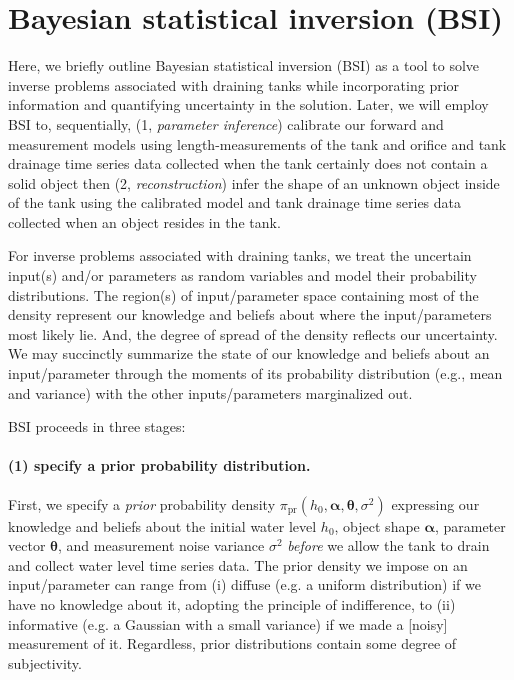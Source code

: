 \documentclass[openacc]{rsproca_new}%
\begin{document}
\section{Bayesian statistical inversion (BSI)} \label{sec:bsi}
Here, we briefly outline Bayesian statistical inversion (BSI)  \cite{calvetti2018inverse,waqar2023tutorial,kaipio2006statistical,dashti2013bayesian} as a tool to solve inverse problems associated with draining tanks while incorporating prior information and quantifying uncertainty in the solution. 
Later, we will employ BSI to, sequentially, (1, \emph{parameter inference}) calibrate our forward and measurement models using length-measurements of the tank and orifice and tank drainage time series data collected when the tank certainly does not contain a solid object then (2, \emph{reconstruction}) infer the shape of an unknown object inside of the tank using the calibrated model and tank drainage time series data collected when an object resides in the tank.

For inverse problems associated with draining tanks, we treat the uncertain input(s) and/or parameters as random variables and model their probability distributions. 
The region(s) of input/parameter space containing most of the density represent our knowledge and beliefs about where the input/parameters most likely lie. And, the degree of spread of the density reflects our uncertainty. We may succinctly summarize the state of our knowledge and beliefs about an input/parameter through the moments of its probability distribution (e.g., mean and variance) with the other inputs/parameters marginalized out. 

BSI proceeds in three stages:

\vspace{-\baselineskip}
\paragraph{(1) specify a prior probability distribution.}
First, we specify a \emph{prior} probability density $\pi_{\text{pr}}(h_0, \boldsymbol \alpha, \boldsymbol \theta, \sigma^2)$ expressing our knowledge and beliefs about the initial water level $h_0$, object shape $\boldsymbol \alpha$, parameter vector $\boldsymbol \theta$, and measurement noise variance $\sigma^2$ \emph{before} we allow the tank to drain and collect water level time series data.
The prior density we impose on an input/parameter can range from (i) diffuse (e.g. a uniform distribution) if we have no knowledge about it, adopting the principle of indifference, to (ii) informative (e.g. a Gaussian with a small variance) if we made a [noisy] measurement of it. Regardless, prior distributions contain some degree of subjectivity.
\cite{van2021bayesian}
\end{document}
